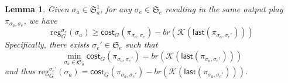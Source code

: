 \documentclass{ifacconf}
\newtheorem{lemma}{Lemma}
\def \K{\mathcal{K}}
\def \last{\textsf{last}}
\def \reg{\text{reg}}
\def \cost{\textsf{cost}}
\def \S{\mathfrak{S}}
\begin{document}
\begin{lemma}\label{lem-env}
Given $\sigma_a\!\in\!\S_a^1$, for any $\sigma_e\!\in\!\S_e$ resulting in the same output play $\pi_{\sigma_a,\sigma_e}$, we have
\begin{equation}\label{eq-1}
    \reg_G^{\sigma_e}(\sigma_a)\geq\cost_G(\pi_{\sigma_a,\sigma_e}) -br(\K(\last(\pi_{\sigma_a,\sigma_e'})))
\end{equation}
Specifically, there exists $\sigma_e'\!\in\!\S_e$ such that %
\begin{equation}\label{eq-2}
    \min_{\sigma_a\in\S_a}\cost_G(\pi_{\sigma_a,\sigma_e'})= br(\K(\last(\pi_{\sigma_a,\sigma_e'})))
\end{equation}
and thus $\reg_G^{\sigma_e'}(\sigma_a)\!=\!\cost_G(\pi_{\sigma_a,\sigma_e'}) -br(\K(\last(\pi_{\sigma_a,\sigma_e'})))$.
\end{lemma}
\end{document}
